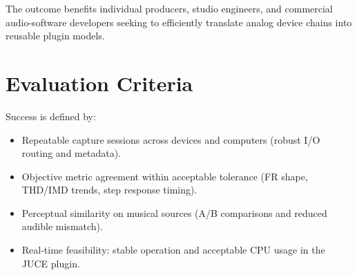 \documentclass[11pt, letterpaper]{article}
\begin{document}
The outcome benefits individual producers, studio engineers, and commercial audio-software developers seeking to efficiently translate analog device chains into reusable plugin models.

\section*{Evaluation Criteria}
\label{sec:eval}

Success is defined by:

\begin{itemize}[leftmargin=1.5em]
    \item Repeatable capture sessions across devices and computers (robust I/O routing and metadata).
    \item Objective metric agreement within acceptable tolerance (FR shape, THD/IMD trends, step
          response timing).
    \item Perceptual similarity on musical sources (A/B comparisons and reduced audible mismatch).
    \item Real-time feasibility: stable operation and acceptable CPU usage in the JUCE plugin.
\end{itemize}
\end{document}
